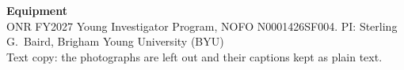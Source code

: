 
\setlength{\emergencystretch}{3em}

\begin{center}\textbf{Equipment}\\
ONR FY2027 Young Investigator Program, NOFO N0001426SF004. PI: Sterling G.\ Baird, Brigham Young University (BYU)\\
{\small\color{gray}Text copy: the photographs are left out and their captions kept as plain text.}\end{center}

